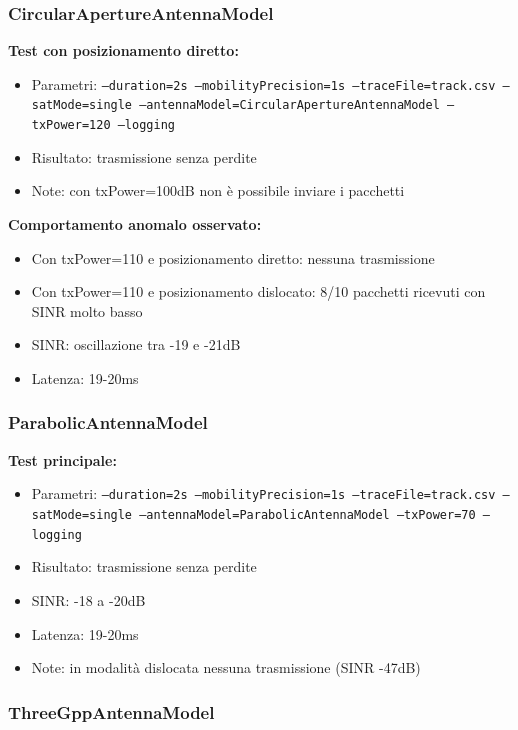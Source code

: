 \documentclass[12pt,a4paper]{article}
\begin{document}
\subsubsection{CircularApertureAntennaModel}

\textbf{Test con posizionamento diretto:}
\begin{itemize}
    \item Parametri: \texttt{--duration=2s --mobilityPrecision=1s --traceFile=track.csv --satMode=single --antennaModel=CircularApertureAntennaModel --txPower=120 --logging}
    \item Risultato: trasmissione senza perdite
    \item Note: con txPower=100dB non è possibile inviare i pacchetti
\end{itemize}


\textbf{Comportamento anomalo osservato:}
\begin{itemize}
    \item Con txPower=110 e posizionamento diretto: nessuna trasmissione
    \item Con txPower=110 e posizionamento dislocato: 8/10 pacchetti ricevuti con SINR molto basso
    \item SINR: oscillazione tra -19 e -21dB
    \item Latenza: 19-20ms
\end{itemize}

\subsubsection{ParabolicAntennaModel}

\textbf{Test principale:}
\begin{itemize}
    \item Parametri: \texttt{--duration=2s --mobilityPrecision=1s --traceFile=track.csv --satMode=single --antennaModel=ParabolicAntennaModel --txPower=70 --logging}
    \item Risultato: trasmissione senza perdite
    \item SINR: -18 a -20dB
    \item Latenza: 19-20ms
    \item Note: in modalità dislocata nessuna trasmissione (SINR -47dB)
\end{itemize}

\subsubsection{ThreeGppAntennaModel}
\end{document}
